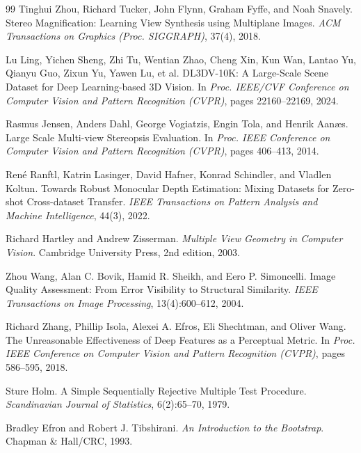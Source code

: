 \begin{thebibliography}{99}
Tinghui Zhou, Richard Tucker, John Flynn, Graham Fyffe, and Noah Snavely.
\newblock Stereo Magnification: Learning View Synthesis using Multiplane Images.
\newblock \emph{ACM Transactions on Graphics (Proc. SIGGRAPH)}, 37(4), 2018.

Lu Ling, Yichen Sheng, Zhi Tu, Wentian Zhao, Cheng Xin, Kun Wan, Lantao Yu, Qianyu Guo, Zixun Yu, Yawen Lu, et al.
\newblock DL3DV-10K: A Large-Scale Scene Dataset for Deep Learning-based 3D Vision.
\newblock In \emph{Proc. IEEE/CVF Conference on Computer Vision and Pattern Recognition (CVPR)}, pages 22160--22169, 2024.

Rasmus Jensen, Anders Dahl, George Vogiatzis, Engin Tola, and Henrik Aan{\ae}s.
\newblock Large Scale Multi-view Stereopsis Evaluation.
\newblock In \emph{Proc. IEEE Conference on Computer Vision and Pattern Recognition (CVPR)}, pages 406--413, 2014.

Ren\'{e} Ranftl, Katrin Lasinger, David Hafner, Konrad Schindler, and Vladlen Koltun.
\newblock Towards Robust Monocular Depth Estimation: Mixing Datasets for Zero-shot Cross-dataset Transfer.
\newblock \emph{IEEE Transactions on Pattern Analysis and Machine Intelligence}, 44(3), 2022.

Richard Hartley and Andrew Zisserman.
\newblock \emph{Multiple View Geometry in Computer Vision}.
\newblock Cambridge University Press, 2nd edition, 2003.

Zhou Wang, Alan C. Bovik, Hamid R. Sheikh, and Eero P. Simoncelli.
\newblock Image Quality Assessment: From Error Visibility to Structural Similarity.
\newblock \emph{IEEE Transactions on Image Processing}, 13(4):600--612, 2004.

Richard Zhang, Phillip Isola, Alexei A. Efros, Eli Shechtman, and Oliver Wang.
\newblock The Unreasonable Effectiveness of Deep Features as a Perceptual Metric.
\newblock In \emph{Proc. IEEE Conference on Computer Vision and Pattern Recognition (CVPR)}, pages 586--595, 2018.

Sture Holm.
\newblock A Simple Sequentially Rejective Multiple Test Procedure.
\newblock \emph{Scandinavian Journal of Statistics}, 6(2):65--70, 1979.

Bradley Efron and Robert J. Tibshirani.
\newblock \emph{An Introduction to the Bootstrap}.
\newblock Chapman \& Hall/CRC, 1993.

\end{thebibliography}
